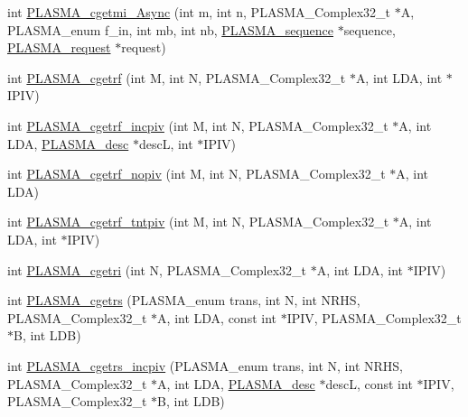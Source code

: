 \begin{DoxyCompactItemize}
\item 
int \hyperlink{group__PLASMA__Complex32__t_gaf7588d0a2e67b2c78032c88dc53cd938_gaf7588d0a2e67b2c78032c88dc53cd938}{P\+L\+A\+S\+M\+A\+\_\+cgetmi\+\_\+\+Async} (int m, int n, P\+L\+A\+S\+M\+A\+\_\+\+Complex32\+\_\+t $\ast$A, P\+L\+A\+S\+M\+A\+\_\+enum f\+\_\+in, int mb, int nb, \hyperlink{structplasma__sequence__t}{P\+L\+A\+S\+M\+A\+\_\+sequence} $\ast$sequence, \hyperlink{structplasma__request__t}{P\+L\+A\+S\+M\+A\+\_\+request} $\ast$request)
\item 
int \hyperlink{group__PLASMA__Complex32__t_ga9a372dbe56f1ef00531a284e1bf3a694_ga9a372dbe56f1ef00531a284e1bf3a694}{P\+L\+A\+S\+M\+A\+\_\+cgetrf} (int M, int N, P\+L\+A\+S\+M\+A\+\_\+\+Complex32\+\_\+t $\ast$A, int L\+D\+A, int $\ast$I\+P\+I\+V)
\item 
int \hyperlink{group__PLASMA__Complex32__t_gaaeca906ffb473a1bc1772671fb4f558f_gaaeca906ffb473a1bc1772671fb4f558f}{P\+L\+A\+S\+M\+A\+\_\+cgetrf\+\_\+incpiv} (int M, int N, P\+L\+A\+S\+M\+A\+\_\+\+Complex32\+\_\+t $\ast$A, int L\+D\+A, \hyperlink{structplasma__desc__t}{P\+L\+A\+S\+M\+A\+\_\+desc} $\ast$desc\+L, int $\ast$I\+P\+I\+V)
\item 
int \hyperlink{group__PLASMA__Complex32__t_ga8a4dcd6c85d88e7af17115cc07ecd72d_ga8a4dcd6c85d88e7af17115cc07ecd72d}{P\+L\+A\+S\+M\+A\+\_\+cgetrf\+\_\+nopiv} (int M, int N, P\+L\+A\+S\+M\+A\+\_\+\+Complex32\+\_\+t $\ast$A, int L\+D\+A)
\item 
int \hyperlink{group__PLASMA__Complex32__t_ga0e2626958aa6a838bdaebbb164fddb7e_ga0e2626958aa6a838bdaebbb164fddb7e}{P\+L\+A\+S\+M\+A\+\_\+cgetrf\+\_\+tntpiv} (int M, int N, P\+L\+A\+S\+M\+A\+\_\+\+Complex32\+\_\+t $\ast$A, int L\+D\+A, int $\ast$I\+P\+I\+V)
\item 
int \hyperlink{group__PLASMA__Complex32__t_gaecd124d0a04fc7a679385fd13018fa02_gaecd124d0a04fc7a679385fd13018fa02}{P\+L\+A\+S\+M\+A\+\_\+cgetri} (int N, P\+L\+A\+S\+M\+A\+\_\+\+Complex32\+\_\+t $\ast$A, int L\+D\+A, int $\ast$I\+P\+I\+V)
\item 
int \hyperlink{group__PLASMA__Complex32__t_ga898ea98a3d182865980c7393dfca2c27_ga898ea98a3d182865980c7393dfca2c27}{P\+L\+A\+S\+M\+A\+\_\+cgetrs} (P\+L\+A\+S\+M\+A\+\_\+enum trans, int N, int N\+R\+H\+S, P\+L\+A\+S\+M\+A\+\_\+\+Complex32\+\_\+t $\ast$A, int L\+D\+A, const int $\ast$I\+P\+I\+V, P\+L\+A\+S\+M\+A\+\_\+\+Complex32\+\_\+t $\ast$B, int L\+D\+B)
\item 
int \hyperlink{group__PLASMA__Complex32__t_ga0f056cec00c55830b06c4439d4892165_ga0f056cec00c55830b06c4439d4892165}{P\+L\+A\+S\+M\+A\+\_\+cgetrs\+\_\+incpiv} (P\+L\+A\+S\+M\+A\+\_\+enum trans, int N, int N\+R\+H\+S, P\+L\+A\+S\+M\+A\+\_\+\+Complex32\+\_\+t $\ast$A, int L\+D\+A, \hyperlink{structplasma__desc__t}{P\+L\+A\+S\+M\+A\+\_\+desc} $\ast$desc\+L, const int $\ast$I\+P\+I\+V, P\+L\+A\+S\+M\+A\+\_\+\+Complex32\+\_\+t $\ast$B, int L\+D\+B)

\end{DoxyCompactItemize}
